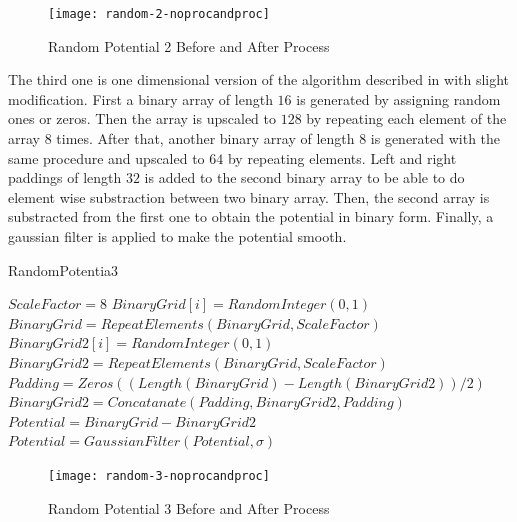\documentclass[a4paper,times,hidelinks,12pt]{article}
\begin{document}
\graphicspath{{"../figs/potentials/"}}
\begin{figure}[H]
    \centering
        \texttt{[image: random-2-noprocandproc]}
\caption{Random Potential 2 Before and After Process}
\label{fig:random2_before_after}
\end{figure}

The third one is one dimensional version of the algorithm described in \cite{mills2017deep} with slight modification. First a binary array of length $16$ is generated by assigning random ones or zeros. Then the array is upscaled to $128$ by repeating each element of the array $8$ times. After that, another binary array of length $8$ is generated with the same procedure and upscaled to $64$ by repeating elements. Left and right paddings of length $32$ is added to the second binary array to be able to do element wise substraction between two binary array. Then, the second array is substracted from the first one to obtain the potential in binary form. Finally, a gaussian filter is applied to make the potential smooth. 

\begin{algorithm}[H]
    \caption{RandomPotentia3}\label{euclid}
    \begin{algorithmic}[1]
        \State $ \textit{ScaleFactor} = 8$
        \State $BinaryGrid[i] = RandomInteger(0, 1)$
        \EndFor
        \State $BinaryGrid = RepeatElements(BinaryGrid, ScaleFactor)$
        \State $BinaryGrid2[i] = RandomInteger(0, 1)$
        \EndFor
        \State $BinaryGrid2 = RepeatElements(BinaryGrid, ScaleFactor)$
        \State $Padding = Zeros((Length(BinaryGrid) - Length(BinaryGrid2))/2)$
        \State $BinaryGrid2 = Concatanate(Padding, BinaryGrid2, Padding) $
        \State $Potential = BinaryGrid - BinaryGrid2$
        \State $Potential = GaussianFilter(Potential, \sigma)$ 
    \EndProcedure
    \end{algorithmic}
\label{alg:random_potential_1}
\end{algorithm}

\graphicspath{{"../figs/potentials/"}}
\begin{figure}[H]
    \centering
        \texttt{[image: random-3-noprocandproc]}
\caption{Random Potential 3 Before and After Process}
\label{fig:random3_before_after}
\end{figure}
\end{document}
